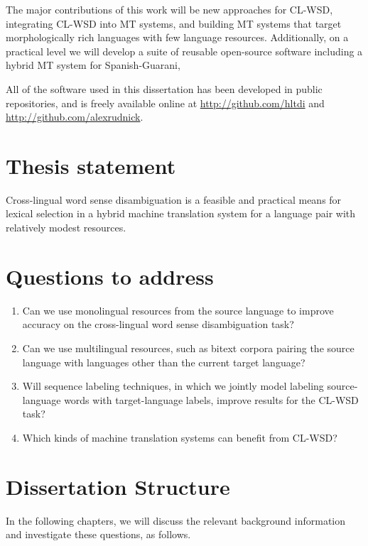 The major contributions of this work will be new approaches for CL-WSD,
integrating CL-WSD into MT systems, and building MT systems that target
morphologically rich languages with few language resources.  Additionally, on a
practical level we will develop a suite of reusable open-source software
including a hybrid MT system for Spanish-Guarani,

All of the software used in this dissertation has been developed in public
repositories, and is freely available online at
\url{http://github.com/hltdi} and \url{http://github.com/alexrudnick}.

\section{Thesis statement}
Cross-lingual word sense disambiguation is a feasible and practical
means for lexical selection in a hybrid machine translation system for a
language pair with relatively modest resources.

\section{Questions to address}
\begin{enumerate}
\item Can we use monolingual resources from the source language to improve
accuracy on the cross-lingual word sense disambiguation task?
\item Can we use multilingual resources, such as bitext corpora pairing the
source language with languages other than the current target language?
\item Will sequence labeling techniques, in which we jointly model labeling
source-language words with target-language labels, improve results for the
CL-WSD task?
\item Which kinds of machine translation systems can benefit from CL-WSD?
\end{enumerate}

\section{Dissertation Structure}
In the following chapters, we will discuss the relevant background information
and investigate these questions, as follows.

